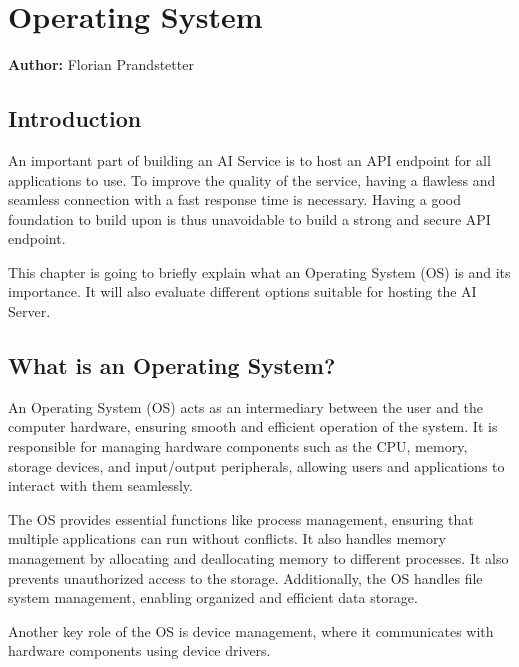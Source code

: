 \chapter{Operating System }
\label{chap:Operating_Systems_used}
\textbf{Author:} Florian Prandstetter

\author{Florian Prandstetter}

\section {Introduction}

An important part of building an AI Service is to host an API endpoint for all applications to use. To improve the quality of the service, having a flawless and seamless connection with a fast response time is necessary.
Having a good foundation to build upon is thus unavoidable to build a strong and secure API endpoint. 

This chapter is going to briefly explain what an Operating System (OS) is and its importance.
It will also evaluate different options suitable for hosting the AI Server.

\section{What is an Operating System?}
\label{sec:WhatIsAnOs}

An Operating System (OS) acts as an intermediary between the user and the computer hardware, ensuring smooth and efficient operation of the system. It is responsible for managing hardware components such as the CPU, memory, storage devices, and input/output peripherals, allowing users and applications to interact with them seamlessly.

The OS provides essential functions like process management, ensuring that multiple applications can run without conflicts. It also handles memory management by allocating and deallocating memory to different processes. It also prevents unauthorized access to the storage.
Additionally, the OS handles file system management, enabling organized and efficient data storage. 

Another key role of the OS is device management, where it communicates with hardware components using device drivers.

